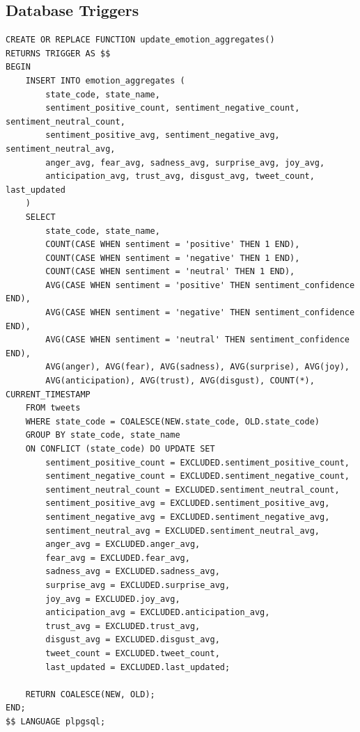 \subsection{Database Triggers}
\begin{verbatim}
CREATE OR REPLACE FUNCTION update_emotion_aggregates()
RETURNS TRIGGER AS $$
BEGIN
    INSERT INTO emotion_aggregates (
        state_code, state_name,
        sentiment_positive_count, sentiment_negative_count, sentiment_neutral_count,
        sentiment_positive_avg, sentiment_negative_avg, sentiment_neutral_avg,
        anger_avg, fear_avg, sadness_avg, surprise_avg, joy_avg, 
        anticipation_avg, trust_avg, disgust_avg, tweet_count, last_updated
    )
    SELECT 
        state_code, state_name,
        COUNT(CASE WHEN sentiment = 'positive' THEN 1 END),
        COUNT(CASE WHEN sentiment = 'negative' THEN 1 END),
        COUNT(CASE WHEN sentiment = 'neutral' THEN 1 END),
        AVG(CASE WHEN sentiment = 'positive' THEN sentiment_confidence END),
        AVG(CASE WHEN sentiment = 'negative' THEN sentiment_confidence END),
        AVG(CASE WHEN sentiment = 'neutral' THEN sentiment_confidence END),
        AVG(anger), AVG(fear), AVG(sadness), AVG(surprise), AVG(joy), 
        AVG(anticipation), AVG(trust), AVG(disgust), COUNT(*), CURRENT_TIMESTAMP
    FROM tweets 
    WHERE state_code = COALESCE(NEW.state_code, OLD.state_code)
    GROUP BY state_code, state_name
    ON CONFLICT (state_code) DO UPDATE SET
        sentiment_positive_count = EXCLUDED.sentiment_positive_count,
        sentiment_negative_count = EXCLUDED.sentiment_negative_count,
        sentiment_neutral_count = EXCLUDED.sentiment_neutral_count,
        sentiment_positive_avg = EXCLUDED.sentiment_positive_avg,
        sentiment_negative_avg = EXCLUDED.sentiment_negative_avg,
        sentiment_neutral_avg = EXCLUDED.sentiment_neutral_avg,
        anger_avg = EXCLUDED.anger_avg,
        fear_avg = EXCLUDED.fear_avg,
        sadness_avg = EXCLUDED.sadness_avg,
        surprise_avg = EXCLUDED.surprise_avg,
        joy_avg = EXCLUDED.joy_avg,
        anticipation_avg = EXCLUDED.anticipation_avg,
        trust_avg = EXCLUDED.trust_avg,
        disgust_avg = EXCLUDED.disgust_avg,
        tweet_count = EXCLUDED.tweet_count,
        last_updated = EXCLUDED.last_updated;
    
    RETURN COALESCE(NEW, OLD);
END;
$$ LANGUAGE plpgsql;
\end{verbatim}


